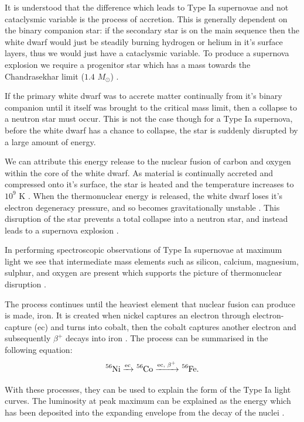 \documentclass[twocolumn]{revtex4}
\begin{document}
It is understood that the difference which leads to Type Ia supernovae and not cataclysmic variable is the process of accretion. This is generally dependent on the binary companion star: if the secondary star is on the main sequence then the white dwarf would just be steadily burning hydrogen or helium in it's surface layers, thus we would just have a cataclysmic variable. To produce a supernova explosion we require a progenitor star which has a mass towards the Chandrasekhar limit ($1.4$ $M_{\odot}$) \cite{posn, longair}. 

If the primary white dwarf was to accrete matter continually from it's binary companion until it itself was brought to the critical mass limit, then a collapse to a neutron star must occur. This is not the case though for a Type Ia supernova, before the white dwarf has a chance to collapse, the star is suddenly disrupted by a large amount of energy.

We can attribute this energy release to the nuclear fusion of carbon and oxygen within the core of the white dwarf. As material is continually accreted and compressed onto it's surface, the star is heated and the temperature increases to $10^9$ K \cite{longair}. When the thermonuclear energy is released, the white dwarf loses it's electron degeneracy pressure, and so becomes gravitationally unstable \cite{longair}. This disruption of the star prevents a total collapse into a neutron star, and instead leads to a supernova explosion \cite{posn}. 

In performing spectroscopic observations of Type Ia supernovae at maximum light we see that intermediate mass elements such as silicon, calcium, magnesium, sulphur, and oxygen are present which supports the picture of thermonuclear disruption \cite{longair, mod_ast}.

The process continues until the heaviest element that nuclear fusion can produce is made, iron. It is created when nickel captures an electron through electron-capture (ec) and turns into cobalt, then the cobalt captures another electron and subsequently $\beta^{+}$ decays into iron \cite{mod_ast}. The process can be summarised in the following equation:
\begin{equation*}
\ce{^{56}Ni} \xrightarrow{\text{ec}} \ce{^{56}Co} \xrightarrow{\text{ec, $\beta^{+}$}} \ce{^{56}Fe}.
\end{equation*}

With these processes, they can be used to explain the form of the Type Ia light curves. The luminosity at peak maximum can be explained as the energy which has been deposited into the expanding envelope from the decay of the  nuclei \cite{mod_ast}. 
\end{document}
